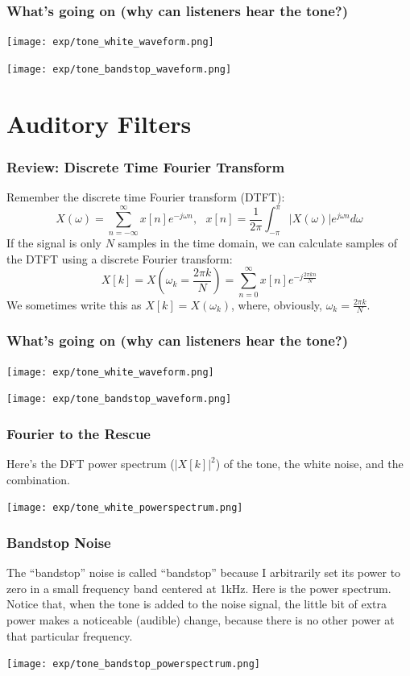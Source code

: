 \documentclass{beamer}
\begin{document}
\begin{frame}
  \frametitle{What's going on (why can listeners hear the tone?)}
  \centerline{\texttt{[image: exp/tone\_white\_waveform.png]}}
  \centerline{\texttt{[image: exp/tone\_bandstop\_waveform.png]}}
\end{frame}

\section[Filters]{Auditory Filters}
\setcounter{subsection}{1}

\begin{frame}
  \frametitle{Review: Discrete Time Fourier Transform}

  Remember the discrete time Fourier transform (DTFT):
  \[
  X(\omega) = \sum_{n=-\infty}^{\infty} x[n]e^{-j\omega n},~~~
  x[n]=\frac{1}{2\pi}\int_{-\pi}^\pi |X(\omega)|e^{j\omega n}d\omega
  \]
  If the signal is only $N$ samples in the time domain, we can
  calculate samples of the DTFT using a  discrete Fourier transform:
  \[
  X[k] = X\left(\omega_k=\frac{2\pi k}{N}\right)=\sum_{n=0}^\infty x[n]e^{-j\frac{2\pi kn}{N}}
  \]
  We sometimes write this as $X[k]=X(\omega_k)$, where, obviously, $\omega_k=\frac{2\pi k}{N}$.
\end{frame}
  
\begin{frame}
  \frametitle{What's going on (why can listeners hear the tone?)}
  \centerline{\texttt{[image: exp/tone\_white\_waveform.png]}}
  \centerline{\texttt{[image: exp/tone\_bandstop\_waveform.png]}}
\end{frame}

\begin{frame}
  \frametitle{Fourier to the Rescue}

  Here's the DFT power spectrum ($|X[k]|^2$) of the tone, the white
  noise, and the combination.
  \centerline{\texttt{[image: exp/tone\_white\_powerspectrum.png]}}
\end{frame}

\begin{frame}
  \frametitle{Bandstop Noise}

  The ``bandstop'' noise is called ``bandstop'' because I arbitrarily set
  its power to zero in a small frequency band centered at 1kHz.  Here is the
  power spectrum.  Notice that, when the tone is added to the noise signal, 
  the little bit of extra power makes a noticeable (audible) change, because
  there is no other power at that particular frequency.
  \centerline{\texttt{[image: exp/tone\_bandstop\_powerspectrum.png]}}
\end{frame}
\end{document}
